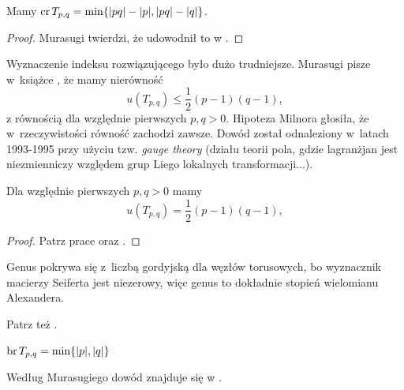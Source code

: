 \begin{proposition}
%
    Mamy $\operatorname{cr} T_{p, q} = \min \{|pq| - |p|, |pq| - |q|\}$.
\end{proposition}

\begin{proof}
    Murasugi twierdzi, że udowodnił to w \cite{murasugi91}.
\end{proof}

Wyznaczenie indeksu rozwiązującego było dużo trudniejsze.
Murasugi pisze w~książce \cite{murasugi96}, że mamy nierówność
\begin{equation}
    u(T_{p, q}) \le \frac 12 (p-1)(q-1),
\end{equation}
z równością dla względnie pierwszych $p, q > 0$.
Hipoteza Milnora głosiła, że w~rzeczywistości równość zachodzi zawsze.
Dowód został odnaleziony w~latach 1993-1995 przy użyciu tzw. \emph{gauge theory} (działu teorii pola, gdzie lagranżjan jest niezmienniczy względem grup Liego lokalnych transformacji...).

\begin{proposition}
%
\label{prp:torus_unknotting_number}%
    Dla względnie pierwszych $p, q > 0$ mamy
    \begin{equation}
        u(T_{p, q}) = \frac 12 (p - 1)(q - 1),
    \end{equation}
\end{proposition}

\begin{proof}
    Patrz prace \cite{kronheimer93} oraz \cite{kronheimer95}.
\end{proof}

Genus pokrywa się z~liczbą gordyjską dla węzłów torusowych, bo wyznacznik macierzy Seiferta jest niezerowy, więc genus to dokładnie stopień wielomianu Alexandera.

Patrz też \cite[s. 149]{murasugi96}.

\begin{proposition}
%
\label{prp:torus_bridge_number}%
    $\operatorname{br} T_{p, q} = \min \{|p|, |q|\}$
\end{proposition}

Według Murasugiego dowód znajduje się w \cite{schubert54}.

